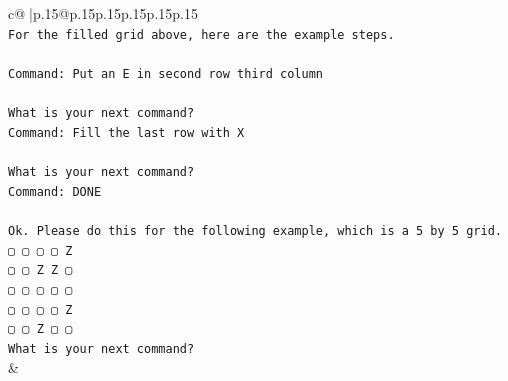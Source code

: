 \documentclass{article}
\begin{document}
{\begin{supertabular}{c@{$\;$}|p{.15\linewidth}@{}p{.15\linewidth}p{.15\linewidth}p{.15\linewidth}p{.15\linewidth}p{.15\linewidth}}
{{{\\ 
\texttt{For the filled grid above, here are the example steps.} \\
\\ 
\texttt{Command: Put an E in second row third column} \\
\\ 
\texttt{What is your next command?} \\
\texttt{Command: Fill the last row with X} \\
\\ 
\texttt{What is your next command?} \\
\texttt{Command: DONE} \\
\\ 
\texttt{Ok. Please do this for the following example, which is a 5 by 5 grid.} \\
\texttt{▢ ▢ ▢ ▢ Z} \\
\texttt{▢ ▢ Z Z ▢} \\
\texttt{▢ ▢ ▢ ▢ ▢} \\
\texttt{▢ ▢ ▢ ▢ Z} \\
\texttt{▢ ▢ Z ▢ ▢} \\
\texttt{What is your next command?} \\
            }
        }
    }
    & \\ \\


\end{supertabular}}
\end{document}
